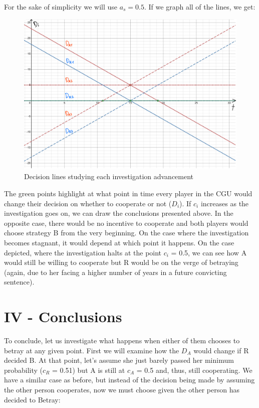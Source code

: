 \documentclass[11pt, a4paper]{article}
\begin{document}
For the sake of simplicity we will use $a_s = 0.5$. If we graph all of the lines, we get:

\begin{figure}[htbp]
\centering
\includegraphics[width=0.8\linewidth]{figure2.png}
\caption{Decision lines studying each investigation advancement}
\label{fig:my_label}
\end{figure}

The green points highlight at what point in time every player in the CGU would change their decision on whether to cooperate or not ($D_i$). If $c_i$ increases as the investigation goes on, we can draw the conclusions presented above. In the opposite case, there would be no incentive to cooperate and both players would choose strategy B from the very beginning. On the case where the investigation becomes stagnant, it would depend at which point it happens. On the case depicted, where the investigation halts at the point $c_i$ = 0.5, we can see how A would still be willing to cooperate but R would be on the verge of betraying (again, due to her facing a higher number of years in a future
convicting sentence).

\section*{IV - Conclusions}

To conclude, let us investigate what happens when either of them chooses to betray at any given point. First we will examine how the $D_A$ would change if R decided B. At that point, let's assume she just barely passed her minimum probability ($c_R$ = 0.51) but A is still at $c_A$ = 0.5 and, thus, still cooperating.
We have a similar case as before, but instead of the decision being made by assuming the other person cooperates, now we must choose given the other person has decided to Betray:
\end{document}
